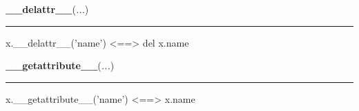    \label{object:__delattr__}

    \vspace{0.5ex}

    \begin{boxedminipage}{\textwidth}

    \raggedright \textbf{\_\_delattr\_\_}(\textit{...})

    \vspace{-1.5ex}

    \rule{\textwidth}{0.5\fboxrule}

x.{\_}{\_}delattr{\_}{\_}('name') {\textless}=={\textgreater} del x.name
    \vspace{1ex}

    \end{boxedminipage}

    \label{object:__getattribute__}

    \vspace{0.5ex}

    \begin{boxedminipage}{\textwidth}

    \raggedright \textbf{\_\_getattribute\_\_}(\textit{...})

    \vspace{-1.5ex}

    \rule{\textwidth}{0.5\fboxrule}

x.{\_}{\_}getattribute{\_}{\_}('name') {\textless}=={\textgreater} x.name
    \vspace{1ex}

    \end{boxedminipage}

    \label{peach:nn:base:Layer:__getitem__}

    \vspace{0.5ex}

